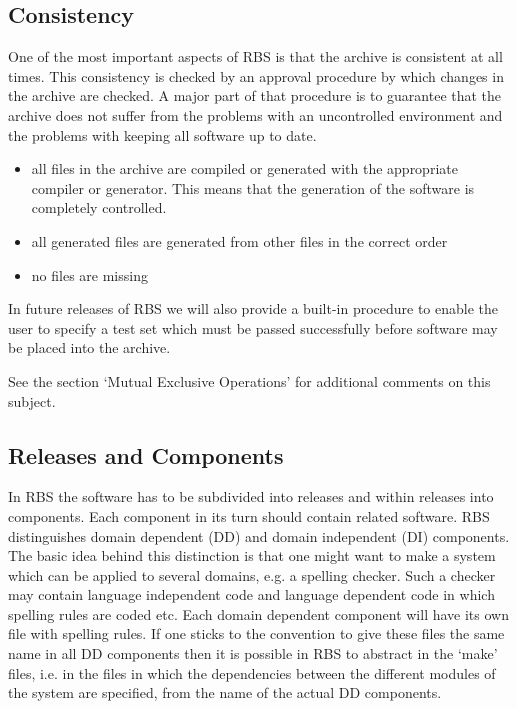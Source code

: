 \subsection{Consistency}
One of the most important aspects of RBS is that the archive is consistent at
all times. This consistency is checked by an approval procedure by which 
changes in the archive are checked. A major part of that procedure is to
guarantee that the archive does not suffer from the problems with an
uncontrolled environment and the problems with keeping all software up to date.
\begin{itemize}
\item all files in the archive are compiled or generated with the appropriate
     compiler or generator. This means that the generation of the software
     is completely controlled.

\item all generated files are generated from other files in the correct order

\item no files are missing
\end{itemize}

In future releases of RBS we will also provide a built-in procedure to 
enable the user to specify a test set which must be passed successfully before
software may be placed into the archive.

See the section `Mutual Exclusive Operations' for additional comments on this
subject.

\subsection{Releases and Components}
In RBS the software has to be subdivided into releases and within releases into
components. Each component in its turn should contain related software.
RBS distinguishes domain dependent (DD) and domain independent (DI) components. The basic idea behind this distinction is that one might want to make a system
which can be applied to several domains, e.g. a spelling checker. Such a
checker may contain language independent code and language dependent code
in which spelling rules are coded etc. Each domain dependent component will
have its own file with spelling rules. If one sticks to the convention to give
these files the same name in all DD components then it is possible in
RBS to abstract in the `make' files, i.e. in the files in which 
the dependencies between the different modules of the system are specified, from
the name of the actual DD components.

